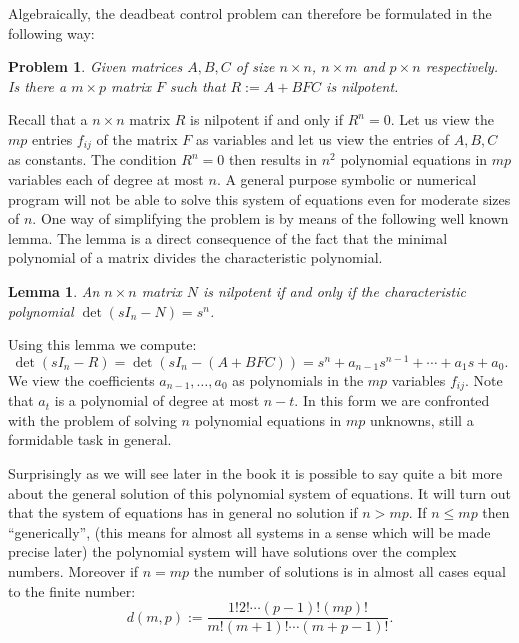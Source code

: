 \documentclass[12pt]{report}
\newtheorem{lem}[thm]{Lemma}
\newtheorem{pro}[thm]{Problem}
\numberwithin{equation}{chapter}
\numberwithin{figure}{chapter}
\begin{document}
Algebraically, the deadbeat control problem
%
can therefore be formulated in the following way:
\begin{pro}
  Given matrices $A,B,C$ of size $n\times n$, $n\times m$ and
  $p\times n$ respectively. Is there a $m\times p$ matrix $F$
  such that $R:=A+BFC$ is nilpotent.
\end{pro}
Recall that a $n\times n$ matrix $R$ is
nilpotent if and only if $R^n=0$.  Let us
view the $mp$ entries $f_{ij}$ of the matrix $F$ as variables and
let us view the entries of $A,B,C$ as constants.  The condition
$R^n=0$ then results in $n^2$ polynomial equations in $mp$
variables each of degree at most $n$. A general purpose symbolic
or numerical program will not be able to solve this system of
equations even for moderate sizes of $n$. One way of simplifying
the problem is by means of the following well known lemma. The
lemma is a direct consequence of the fact that the minimal
polynomial of a matrix divides the characteristic
polynomial.
\begin{lem}
  An $n\times n$ matrix $N$ is nilpotent if and only if the
  characteristic polynomial $\det(sI_n-N)=s^n$.
\end{lem}
Using this lemma we compute:
$$
\det(sI_n-R)=\det(sI_n-(A+BFC))
=s^n+a_{n-1}s^{n-1}+\cdots+a_1s+a_0.
$$
We view the coefficients $a_{n-1},\ldots,a_0$ as polynomials
in the $mp$ variables $f_{ij}$. Note that $a_t$ is a polynomial
of degree at most $n-t$. In this form we are confronted with the
problem of solving $n$ polynomial equations in $mp$ unknowns,
still a formidable task in general.

Surprisingly as we will see later in the book it is possible to
say quite a bit more about the general solution of this
polynomial system of equations. It will turn out that the system
of equations has in general no solution if $n>mp$. If $n\leq mp$
then ``generically'',  (this means for almost
all systems in a sense which will be made precise later) the
polynomial system will have solutions over the complex numbers.
Moreover if $n=mp$ the number of solutions is in almost all cases
equal to the finite number:
$$
d(m,p):=\frac{1!2!\cdots (p-1)! (mp)!}{m!(m+1)!\cdots (m+p-1)!}.
$$
\end{document}
